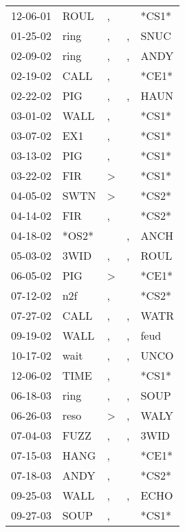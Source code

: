 \begin{supertabular}{lllll}
 12-06-01 &   ROUL &             , &               &  *CS1* \\
 01-25-02 &   ring &             , &             , &   SNUC \\
 02-09-02 &   ring &             , &             , &   ANDY \\
 02-19-02 &   CALL &             , &               &  *CE1* \\
 02-22-02 &    PIG &             , &             , &   HAUN \\
 03-01-02 &   WALL &             , &               &  *CS1* \\
 03-07-02 &    EX1 &             , &               &  *CS1* \\
 03-13-02 &    PIG &             , &               &  *CS1* \\
 03-22-02 &    FIR &  \textgreater &               &  *CS1* \\
 04-05-02 &   SWTN &  \textgreater &               &  *CS2* \\
 04-14-02 &    FIR &             , &               &  *CS2* \\
 04-18-02 &  *OS2* &               &             , &   ANCH \\
 05-03-02 &   3WID &             , &             , &   ROUL \\
 06-05-02 &    PIG &  \textgreater &               &  *CE1* \\
 07-12-02 &    n2f &             , &               &  *CS2* \\
 07-27-02 &   CALL &             , &             , &   WATR \\
 09-19-02 &   WALL &             , &             , &   feud \\
 10-17-02 &   wait &             , &             , &   UNCO \\
 12-06-02 &   TIME &             , &               &  *CS1* \\
 06-18-03 &   ring &             , &             , &   SOUP \\
 06-26-03 &   reso &  \textgreater &             , &   WALY \\
 07-04-03 &   FUZZ &             , &             , &   3WID \\
 07-15-03 &   HANG &             , &               &  *CE1* \\
 07-18-03 &   ANDY &             , &               &  *CS2* \\
 09-25-03 &   WALL &             , &             , &   ECHO \\
 09-27-03 &   SOUP &             , &               &  *CS1* \\

\end{supertabular}
